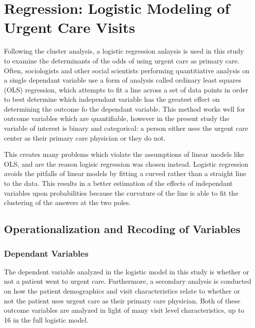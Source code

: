 \documentclass[12pt,twoside]{reedthesis}
\begin{document}
  \section{Regression: Logistic Modeling of Urgent Care
  Visits}\label{regression-logistic-modeling-of-urgent-care-visits}
  
  \doublespacing
  
  Following the cluster analysis, a logistic regression anlaysis is used
  in this study to examine the determinants of the odds of using urgent
  care as primary care. Often, sociologists and other social scientists
  performing quantitiative analysis on a single dependant variable use a
  form of analysis called ordinary least squares (OLS) regression, which
  attempts to fit a line across a set of data points in order to best
  determine which independant variable has the greatest effect on
  determining the outcome fo the dependant variable. This method works
  well for outcome variables which are quantifiable, however in the
  present study the variable of interest is binary and categorical: a
  person either uses the urgent care center as their primary care
  physician or they do not.
  
  This creates many problems which violate the assumptions of linear
  models like OLS, and are the reason logisic regression was chosen
  instead. Logistic regression avoids the pitfalls of linear models by
  fitting a curved rather than a straight line to the data. This results
  in a better estimation of the effects of independant variables upon
  probabilities because the curvature of the line is able to fit the
  clustering of the answers at the two poles.
  
  \subsection{Operationalization and Recoding of
  Variables}\label{operationalization-and-recoding-of-variables}
  
  \subsubsection{Dependant Variables}\label{dependant-variables}
  
  The dependent variable analyzed in the logistic model in this study is
  whether or not a patient went to urgent care. Furthermore, a secondary
  analysis is conducted on how the patient demographics and visit
  characteristics relate to whether or not the patient uses urgent care as
  their primary care physician. Both of these outcome variables are
  analyzed in light of many visit level characteristics, up to 16 in the
  full logistic model.
  
\end{document}
